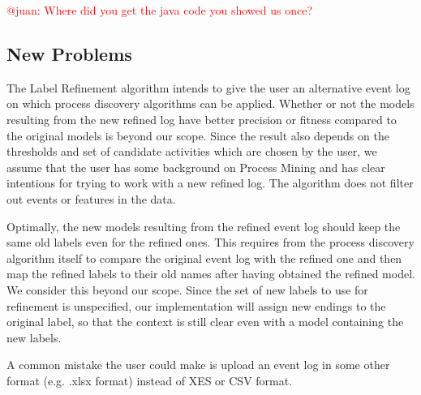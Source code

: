 \documentclass[notitlepage]{article}
\begin{document}
\begin{flushleft}
\textcolor{red}{@juan: Where did you get the java code you showed us once?}

\subsection{New Problems}
The Label Refinement algorithm intends to give the user an alternative event log on which process discovery algorithms can be applied.
Whether or not the models resulting from the new refined log have better precision or fitness compared to the original models is beyond our scope.
Since the result also depends on the thresholds and set of candidate activities which are chosen by the user, we assume that the user has some background on Process Mining and has clear intentions for trying to work with a new refined log.
The algorithm does not filter out events or features in the data.

Optimally, the new models resulting from the refined event log should keep the same old labels even for the refined ones.
This requires from the process discovery algorithm itself to compare the original event log with the refined one and then map the refined labels to their old names after having obtained the refined model.
We consider this beyond our scope.
Since the set of new labels to use for refinement is unspecified, our implementation will assign new endings to the original label, so that the context is still clear even with a model containing the new labels.

A common mistake the user could make is upload an event log in some other format (e.g. .xlsx format) instead of XES or CSV format.





\end{flushleft}
\end{document}
